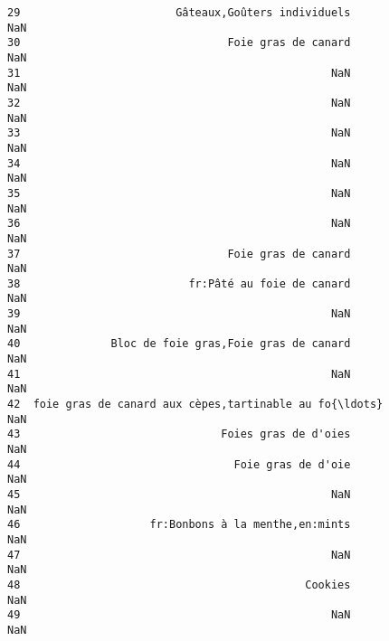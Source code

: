 \documentclass[11pt]{article}
\begin{document}
\begin{tcolorbox}[breakable, size=fbox, boxrule=.5pt, pad at break*=1mm, opacityfill=0]
\begin{Verbatim}[commandchars=\\\{\}]
29                        Gâteaux,Goûters individuels                    NaN
30                                Foie gras de canard                    NaN
31                                                NaN                    NaN
32                                                NaN                    NaN
33                                                NaN                    NaN
34                                                NaN                    NaN
35                                                NaN                    NaN
36                                                NaN                    NaN
37                                Foie gras de canard                    NaN
38                          fr:Pâté au foie de canard                    NaN
39                                                NaN                    NaN
40              Bloc de foie gras,Foie gras de canard                    NaN
41                                                NaN                    NaN
42  foie gras de canard aux cèpes,tartinable au fo{\ldots}                    NaN
43                               Foies gras de d'oies                    NaN
44                                 Foie gras de d'oie                    NaN
45                                                NaN                    NaN
46                    fr:Bonbons à la menthe,en:mints                    NaN
47                                                NaN                    NaN
48                                            Cookies                    NaN
49                                                NaN                    NaN


\end{Verbatim}
\end{tcolorbox}
\end{document}
